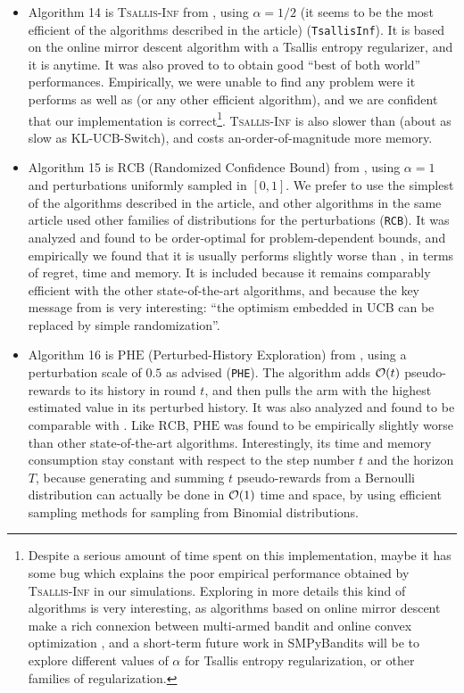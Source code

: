 \begin{itemize}
    \item Algorithm 14 is
    \textsc{Tsallis-Inf} from \cite{Zimmert2018}, using $\alpha=1/2$ (it seems to be the most efficient of the algorithms described in the article) (\texttt{TsallisInf}).
    It is based on the online mirror descent algorithm with a Tsallis entropy regularizer, and it is anytime.
    It was also proved to to obtain good ``best of both world'' performances.
    Empirically, we were unable to find any problem were it performs as well as \UCB{} (or any other efficient algorithm), and we are confident that our implementation is correct\footnote{Despite a serious amount of time spent on this implementation, maybe it has some bug which explains the poor empirical performance obtained by \textsc{Tsallis-Inf} in our simulations. Exploring in more details this kind of algorithms is very interesting, as algorithms based on online mirror descent make a rich connexion between multi-armed bandit and online convex optimization \cite{Hazan2016introduction}, and a short-term future work in SMPyBandits will be to explore different values of $\alpha$ for Tsallis entropy regularization, or other families of regularization.}.
    \textsc{Tsallis-Inf} is also slower than \UCB{} (about as slow as KL-UCB-Switch), and costs an-order-of-magnitude more memory.

    \item Algorithm 15 is
    $\mathrm{RCB}$ (Randomized Confidence Bound) from \cite{KimTewari2019}, using $\alpha=1$ and perturbations uniformly sampled in $[0,1]$. We prefer to use the simplest of the algorithms described in the article, and other algorithms in the same article used other families of distributions for the perturbations (\texttt{RCB}).
    It was analyzed and found to be order-optimal for problem-dependent bounds, and empirically we found that it is usually performs slightly worse than \UCB, in terms of regret, time and memory.
    It is included because it remains comparably efficient with the other state-of-the-art algorithms, and because the key message from \cite{KimTewari2019} is very interesting:
    ``the optimism embedded in UCB can be replaced by simple randomization''.

    \item Algorithm 16 is
    $\mathrm{PHE}$ (Perturbed-History Exploration) from \cite{KvetonSzepesvari2019}, using a perturbation scale of $0.5$ as advised (\texttt{PHE}).
    The algorithm adds $\mathcal{O}(t)$ \iid{} pseudo-rewards to its history in round $t$, and then pulls the arm with the highest estimated value in its perturbed history.
    It was also analyzed and found to be comparable with \UCB.
    Like $\mathrm{RCB}$, $\mathrm{PHE}$ was found to be empirically slightly worse than other state-of-the-art algorithms.
    Interestingly, its time and memory consumption stay constant with respect to the step number $t$ and the horizon $T$, because generating and summing $t$ pseudo-rewards from a Bernoulli distribution can actually be done in $\mathcal{O}(1)$ time and space, by using efficient sampling methods for sampling from Binomial distributions.
\end{itemize}

